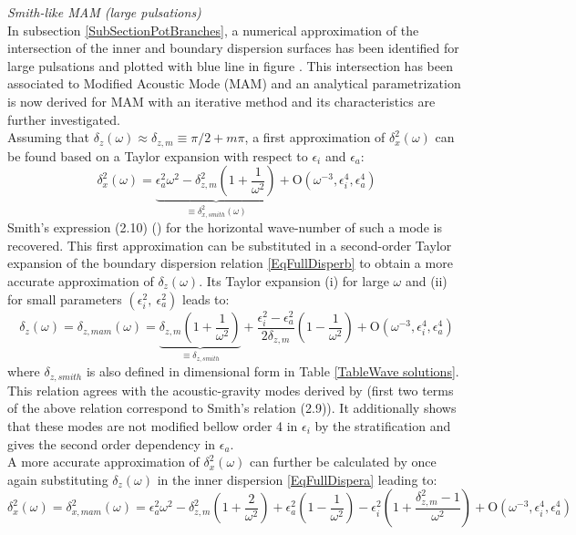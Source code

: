 \documentclass[a4paper,11pt]{article}
\begin{document}
\textit{Smith-like MAM (large pulsations)}\\
In subsection \ref{SubSectionPotBranches}, a numerical approximation of the intersection of the inner and boundary dispersion surfaces has been identified for large pulsations and plotted with blue line in figure . This intersection has been associated to Modified Acoustic Mode (MAM) and an analytical parametrization is now derived for MAM with an iterative method and its characteristics are further investigated.\\ Assuming that $\delta_z(\omega)\approx\delta_{z,m} \equiv \pi/2+m\pi$, a first approximation of $\delta_x^2(\omega)$ can be found based on a Taylor expansion with respect to $\epsilon_i$ and $\epsilon_a$:
\begin{equation}
    \delta_{x}^2(\omega) = \underbrace{\epsilon_a^2\omega^2
    -\delta_{z,m}^2\left(1+\frac{1}{\omega^2}\right)}_{\equiv\delta_{x,smith}^2(\omega)}
    	+\mathrm{O}	(\omega^{-3},\epsilon_i^4,\epsilon_a^4)
\end{equation}
Smith's expression (2.10) (\cite{smith_2015}) for the horizontal wave-number of such a mode is recovered. This first approximation can be substituted in a second-order Taylor expansion of the boundary dispersion relation \ref{EqFullDisperb} to obtain a more accurate approximation of $\delta_z(\omega)$. Its Taylor expansion (i) for large $\omega$ and (ii) for small parameters $(\epsilon_i^2,\ \epsilon_a^2)$ leads to:
\begin{equation}
	\label{paramMAM1}
	\delta_{z}(\omega)=\delta_{z,mam}(\omega) = 
	\underbrace{\delta_{z,m}\left(1+\frac{1}{\omega^2}\right)}_{\equiv\delta_{z,smith}}
	+\frac{\epsilon_i^2-\epsilon_a^2}{2\delta_{z,m}}\left(1-\frac{1}{\omega^2} \right)
	+\mathrm{O}	(\omega^{-3},\epsilon_i^4,\epsilon_a^4)
\end{equation}
where $\delta_{z,smith}$ is also defined in dimensional form in Table \ref{TableWave solutions}. This relation agrees with the acoustic-gravity modes derived by \cite{smith_2015} (first two terms of the above relation correspond to Smith's relation (2.9)). It additionally shows that these modes are not modified bellow order 4 in $\epsilon_i$ by the stratification and gives the second order dependency in $\epsilon_a$.\\
A more accurate approximation of $\delta_x^2(\omega)$ can further be calculated by once again substituting $\delta_z(\omega)$ in the inner dispersion \ref{EqFullDispera} leading to:
\begin{equation}
	\label{paramMAM2}
	\delta_x^2(\omega)=\delta_{x,mam}^2(\omega) = \epsilon_a^2\omega^2
	-\delta_{z,m}^2\left(1+\frac{2}{\omega^2}\right)
	+\epsilon_a^2\left(1-\frac{1}{\omega^2}\right)
	-\epsilon_i^2\left(1+\frac{\delta_{z,m}^2-1}{\omega^2}\right)
	+\mathrm{O}	(\omega^{-3},\epsilon_i^4,\epsilon_a^4)
\end{equation}
\end{document}
